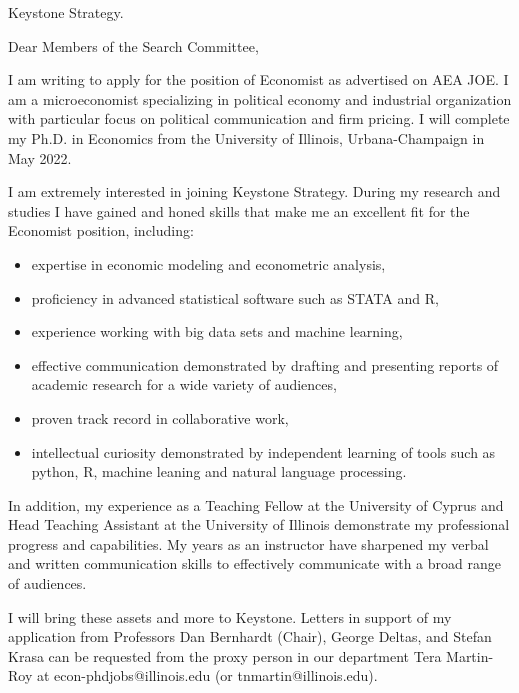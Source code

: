\documentclass[12pt]{letter}
\begin{document}
\date{}
\begin{letter}{Keystone Strategy.}

\opening{Dear Members of the Search Committee,}

I am writing to apply for the position of Economist as advertised on AEA JOE.
I am a microeconomist specializing in political economy and industrial organization with particular focus on political communication and firm pricing.
I will complete my Ph.D. in Economics from the University of Illinois, Urbana-Champaign in May 2022. 

I am extremely interested in joining Keystone Strategy.
During my research and studies I have gained and honed skills that make me an excellent fit for the Economist position, including:

\begin{itemize}
    \item expertise in economic modeling and econometric analysis,
    \item proficiency in advanced statistical software such as STATA and R,
    \item experience working with big data sets and machine learning,
    \item effective communication demonstrated by drafting and presenting reports of academic research for a wide variety of audiences,
    \item proven track record in collaborative work,
    \item intellectual curiosity demonstrated by independent learning of tools such as python, R, machine leaning and natural language processing.
\end{itemize}

In addition, my experience as a Teaching Fellow at the University of Cyprus and Head Teaching Assistant at the University of Illinois demonstrate my professional progress and capabilities.
My years as an instructor have sharpened my verbal and written communication skills to effectively communicate with a broad range of audiences.

I will bring these assets and more to Keystone.
Letters in support of my application from Professors Dan Bernhardt (Chair), George Deltas, and Stefan Krasa can be requested from the proxy person in our department Tera Martin-Roy at econ-phdjobs@illinois.edu (or tnmartin@illinois.edu).


\end{letter}
\end{document}
